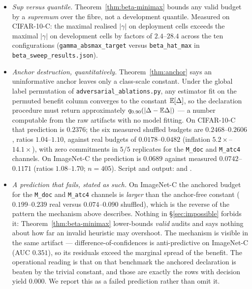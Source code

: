 \begin{remark}
\begin{itemize}
and $0.511$ in Table~\ref{tab:beta-sweep} (which uses the primary $\widehat\beta=0.0302$); it is
also the configuration with commit-error $0.532$ on $62$ committed cells (sign match $0.468$, $95\%$
CI $[0.340,0.599]$).
\item \emph{Sup versus quantile.} Theorem~\ref{thm:beta-minimax} bounds any valid budget by a
\emph{supremum} over the fibre, not a development quantile. Measured on CIFAR-10-C: the maximal
realised $|\gamma|$ on deployment cells exceeds the maximal $|\gamma|$ on development cells by
factors of $2.4$--$28.4$ across the ten configurations (\texttt{gamma\_absmax\_target} versus
\texttt{beta\_hat\_max} in \texttt{beta\_sweep\_results.json}).
\item \emph{Anchor destruction, quantitatively.} Theorem~\ref{thm:anchor} says an uninformative
anchor leaves only a class-scale constant. Under the global label permutation of
\texttt{adversarial\_ablations.py}, any estimator fit on the permuted benefit column converges to
the constant $\mathbb{E}[\Delta]$, so the declaration procedure must return approximately
$q_{0.90}(|\Delta-\mathbb{E}\Delta|)$ --- a number computable from the raw artifacts with no model fitting.
On CIFAR-10-C that prediction is $0.2376$; the six measured shuffled budgets are
$0.2468$--$0.2606$, ratios $1.04$--$1.10$, against real budgets of $0.0178$--$0.0482$ (inflation
$5.2\times$--$14.1\times$), with zero commitments in $5/5$ replicates for the \texttt{M\_doc} and
\texttt{M\_atc4} channels. On ImageNet-C the prediction is $0.0689$ against measured
$0.0742$--$0.1171$ (ratios $1.08$--$1.70$; $n=405$). Script and output:
 and
.
\item \emph{A prediction that fails, stated as such.} On ImageNet-C the anchored budget for the
\texttt{M\_doc} and \texttt{M\_atc4} channels is \emph{larger} than the anchor-free constant
($0.199$--$0.239$ real versus $0.074$--$0.090$ shuffled), which is the reverse of the pattern the
mechanism above describes. Nothing in \S\ref{sec:impossible} forbids it:
Theorem~\ref{thm:beta-minimax} lower-bounds \emph{valid} audits and says nothing about how far an
invalid heuristic may overshoot. The mechanism is visible in the same artifact ---
difference-of-confidences is anti-predictive on ImageNet-C (AUC $0.351$), so its residuals exceed
the marginal spread of the benefit. The operational reading is that on that benchmark the anchored
declaration is beaten by the trivial constant, and those are exactly the rows with decision yield
$0.000$. We report this as a failed prediction rather than omit it.
\end{itemize}
\end{remark}
